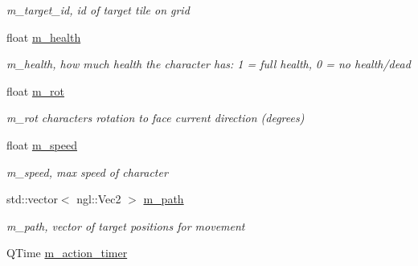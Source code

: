 \begin{DoxyCompactItemize}
\begin{DoxyCompactList}\small\item\em m\+\_\+target\+\_\+id, id of target tile on grid \end{DoxyCompactList}\item 
\hypertarget{class_a_i_ad4ebaada567bc96cefdd757bc2bedf49}{}float \hyperlink{class_a_i_ad4ebaada567bc96cefdd757bc2bedf49}{m\+\_\+health}\label{class_a_i_ad4ebaada567bc96cefdd757bc2bedf49}

\begin{DoxyCompactList}\small\item\em m\+\_\+health, how much health the character has\+: 1 = full health, 0 = no health/dead \end{DoxyCompactList}\item 
\hypertarget{class_a_i_af2ef88fd6f0e45912fe0273ad031274a}{}float \hyperlink{class_a_i_af2ef88fd6f0e45912fe0273ad031274a}{m\+\_\+rot}\label{class_a_i_af2ef88fd6f0e45912fe0273ad031274a}

\begin{DoxyCompactList}\small\item\em m\+\_\+rot character\textquotesingle{}s rotation to face current direction (degrees) \end{DoxyCompactList}\item 
\hypertarget{class_a_i_a1de298736f7531aa92a3f53a27f8b4fd}{}float \hyperlink{class_a_i_a1de298736f7531aa92a3f53a27f8b4fd}{m\+\_\+speed}\label{class_a_i_a1de298736f7531aa92a3f53a27f8b4fd}

\begin{DoxyCompactList}\small\item\em m\+\_\+speed, max speed of character \end{DoxyCompactList}\item 
\hypertarget{class_a_i_a61901b6945955efec6266752095fe6a6}{}std\+::vector$<$ ngl\+::\+Vec2 $>$ \hyperlink{class_a_i_a61901b6945955efec6266752095fe6a6}{m\+\_\+path}\label{class_a_i_a61901b6945955efec6266752095fe6a6}

\begin{DoxyCompactList}\small\item\em m\+\_\+path, vector of target positions for movement \end{DoxyCompactList}\item 
\hypertarget{class_a_i_aed2d1975dff23be480a7d7237c87a187}{}Q\+Time \hyperlink{class_a_i_aed2d1975dff23be480a7d7237c87a187}{m\+\_\+action\+\_\+timer}\label{class_a_i_aed2d1975dff23be480a7d7237c87a187}


\end{DoxyCompactItemize}
